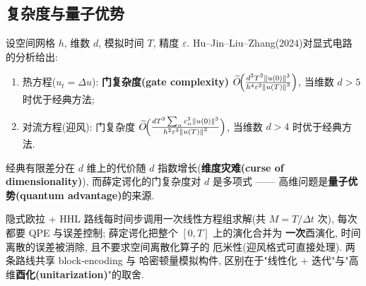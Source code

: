 \documentclass[utf8]{article} %
\numberwithin{equation}{section}   %
\newtheorem{Thm}{\hskip 2em {\color{blue} 定理}}[subsection]
\newtheorem{Note}{\hskip 2em {\color{red} 注}}[subsection]
\begin{document}
\subsection{复杂度与量子优势}

\begin{Thm}
    设空间网格 $h$, 维数 $d$, 模拟时间 $T$, 精度 $\varepsilon$.
    Hu--Jin--Liu--Zhang(2024)对显式电路的分析给出:
    \begin{enumerate}
        \item 热方程($u_t = \Delta u$): \textbf{门复杂度(gate complexity)}
        $\widetilde O\!\Big(\frac{d^2 T^2 \norm{u(0)}^3}{h^4 \varepsilon^3 \norm{u(T)}^3}\Big)$,
        当维数 $d > 5$ 时优于经典方法;
        \item 对流方程(迎风): 门复杂度
        $\widetilde O\!\Big(\frac{d T^2 \sum_\alpha c_\alpha^2 \norm{u(0)}^3}{h^2 \varepsilon^3 \norm{u(T)}^3}\Big)$,
        当维数 $d > 4$ 时优于经典方法.
    \end{enumerate}
    经典有限差分在 $d$ 维上的代价随 $d$ 指数增长(\textbf{维度灾难(curse of dimensionality)}),
    而薛定谔化的门复杂度对 $d$ 是多项式 —— 高维问题是\textbf{量子优势(quantum advantage)}的来源.
\end{Thm}

\begin{Note}
    隐式欧拉 + HHL 路线每时间步调用一次线性方程组求解(共 $M = T/\Delta t$ 次),
    每次都要 QPE 与误差控制; 薛定谔化把整个 $[0,T]$ 上的演化合并为
    \textbf{一次}酉演化, 时间离散的误差被消除, 且不要求空间离散化算子的
    厄米性(迎风格式可直接处理). 两条路线共享 block-encoding 与
    哈密顿量模拟构件, 区别在于"线性化 + 迭代"与"高维\textbf{酉化(unitarization)}"的取舍.
\end{Note}
\end{document}
